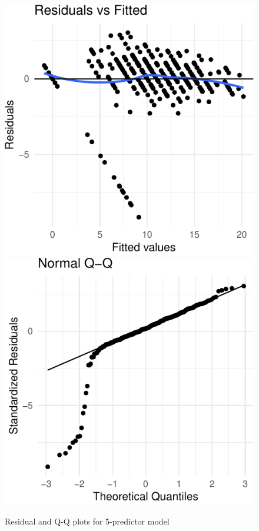 \documentclass[a4paper,9pt,twocolumn,twoside,]{pinp}
\begin{document}
\begin{figure}[htbp]

{\centering \includegraphics[width=0.45\linewidth]{Executive-summary_files/figure-latex/resid-qq-5var-1} \includegraphics[width=0.45\linewidth]{Executive-summary_files/figure-latex/resid-qq-5var-2} 

}

\caption{Residual and Q-Q plots for 5-predictor model}\label{fig:resid-qq-5var}
\end{figure}
\end{document}
